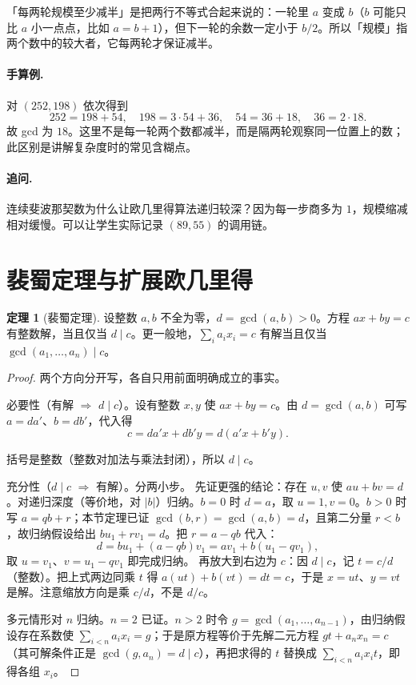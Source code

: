 \documentclass[UTF8,a4paper,11pt,oneside,openany,fontset=fandol]{ctexbook}
\theoremstyle{definition}
\newtheorem{theorem}[definition]{定理}
\begin{document}
\begin{tip}
「每两轮规模至少减半」是把两行不等式合起来说的：一轮里 $a$ 变成 $b$（$b$ 可能只比 $a$ 小一点点，比如 $a=b+1$），但下一轮的余数一定小于 $b/2$。所以「规模」指两个数中的较大者，它每两轮才保证减半。
\end{tip}



\paragraph{手算例.} 对 $(252,198)$ 依次得到
\[
252=198+54,\quad198=3\cdot54+36,\quad54=36+18,\quad36=2\cdot18.
\]
故 gcd 为 $18$。这里不是每一轮两个数都减半，而是隔两轮观察同一位置上的数；此区别是讲解复杂度时的常见含糊点。
\paragraph{追问.} 连续斐波那契数为什么让欧几里得算法递归较深？因为每一步商多为 $1$，规模缩减相对缓慢。可以让学生实际记录 $(89,55)$ 的调用链。


\section{裴蜀定理与扩展欧几里得}
\begin{theorem}[裴蜀定理]
设整数 $a,b$ 不全为零，$d=\gcd(a,b)>0$。方程 $ax+by=c$ 有整数解，当且仅当 $d\mid c$。更一般地，$\sum_i a_ix_i=c$ 有解当且仅当 $\gcd(a_1,\ldots,a_n)\mid c$。
\end{theorem}
\begin{proof}
两个方向分开写，各自只用前面明确成立的事实。

必要性（有解 $\Rightarrow$ $d\mid c$）。设有整数 $x,y$ 使 $ax+by=c$。由 $d=\gcd(a,b)$ 可写 $a=da'$、$b=db'$，代入得
\[
 c=da'x+db'y=d(a'x+b'y).
\]


括号是整数（整数对加法与乘法封闭），所以 $d\mid c$。

充分性（$d\mid c$ $\Rightarrow$ 有解）。分两小步。
先证更强的结论：存在 $u,v$ 使 $au+bv=d$。对递归深度（等价地，对 $|b|$）归纳。$b=0$ 时 $d=a$，取 $u=1,v=0$。$b>0$ 时写 $a=qb+r$；本节定理已证 $\gcd(b,r)=\gcd(a,b)=d$，且第二分量 $r<b$，故归纳假设给出 $bu_1+rv_1=d$。把 $r=a-qb$ 代入：
\[
 d=bu_1+(a-qb)v_1=av_1+b(u_1-qv_1),
\]
取 $u=v_1$、$v=u_1-qv_1$ 即完成归纳。
再放大到右边为 $c$：因 $d\mid c$，记 $t=c/d$（整数）。把上式两边同乘 $t$ 得 $a(ut)+b(vt)=dt=c$，于是 $x=ut$、$y=vt$ 是解。注意缩放方向是乘 $c/d$，不是 $d/c$。

多元情形对 $n$ 归纳。$n=2$ 已证。$n>2$ 时令 $g=\gcd(a_1,\ldots,a_{n-1})$，由归纳假设存在系数使 $\sum_{i<n}a_ix_i=g$；于是原方程等价于先解二元方程 $gt+a_nx_n=c$（其可解条件正是 $\gcd(g,a_n)=d\mid c$），再把求得的 $t$ 替换成 $\sum_{i<n}a_ix_it$，即得各组 $x_i$。
\end{proof}
\end{document}
